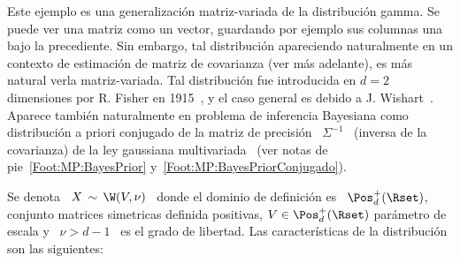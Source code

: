 \label{Sssec:MP:Wishart}

Este ejemplo es una  generalizaci\'on matriz-variada de la distribuci\'on gamma.
Se puede ver  una matriz como un vector, guardando por  ejemplo sus columnas una
bajo la  precediente.  Sin embargo, tal  distribuci\'on apareciendo naturalmente
en un contexto de estimaci\'on de  matriz de covarianza (ver m\'as adelante), es
m\'as natural verla matriz-variada.  Tal distribuci\'on fue introducida en $d=2$
dimensiones por R. Fisher en 1915~\cite{Fis15}, y el caso general es debido a J.
Wishart~\cite{Wis28,   Mui82,  BilBre99,   GupNag99,  And03,   Seb04}.   Aparece
tambi\'en naturalmente en problema de inferencia Bayesiana como distribuci\'on a
priori conjugado  de la matriz de  precisi\'on \ $\Sigma^{-1}$ \  (inversa de la
covarianza)  de  la  ley gaussiana  multivariada~\cite[Ec.~(4.4.5)]{Rob07}  (ver
notas de pie~\ref{Foot:MP:BayesPrior} y~\ref{Foot:MP:BayesPriorConjugado}).

Se denota  \ $X \, \sim  \, \W(V,\nu)$ \ donde  el dominio de  definici\'on es \
$\Pos_d^+(\Rset)$,  conjunto   matrices  simetricas  definida   positivas,  $V  \in
\Pos_d^+(\Rset)$ par\'ametro de escala  y \ $\nu > d-1$ \ es  el grado de libertad.
Las caracter\'isticas de la distribuci\'on son las siguientes:

